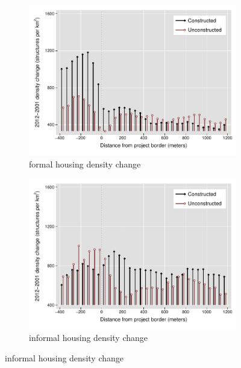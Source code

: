 \documentclass[12pt]{article}
\begin{document}
\begin{figure}[t!]
        \centering
        \caption[ Changes in Housing Densities in Constructed and Unconstructed Projects Areas]
        {\small Housing Densities in Constructed and Unconstructed projects } 
        \begin{subfigure}[b]{0.495\textwidth}   
            \centering 
            \includegraphics[width=\textwidth,trim={0.3cm .3cm 0.1cm 0cm}, clip=true]{figures/bblu_for_rawchanges}
            \caption[]%
            {{\small formal housing density change}}    
            \label{fig:forchange}
        \end{subfigure}
        \hfill
        \begin{subfigure}[b]{0.495\textwidth}   
            \centering 
            \includegraphics[width=\textwidth,trim={0.3cm .3cm 0.1cm 0cm}, clip=true]{figures/bblu_inf_rawchanges}
            \caption[]%
            {{\small informal housing density change}}    
            \label{fig:infchange}
        \end{subfigure}
        \label{fig:rawbblumeanschange}
        \vspace{-6mm}
    \end{figure} 
\end{document}

